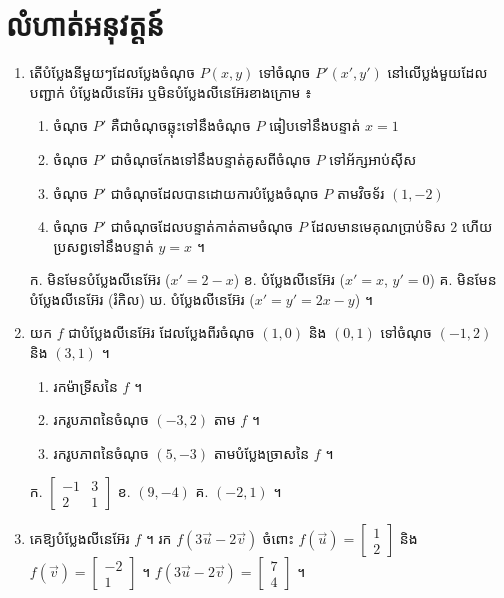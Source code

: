 \section*{លំហាត់អនុវត្តន៍}
\begin{enumerate}[1]
  \item តើបំប្លែងនីមួយៗដែលប្លែងចំណុច $P(x, y)$ ទៅចំណុច $P'(x', y')$ នៅលើប្លង់មួយដែលបញ្ជាក់ បំប្លែងលីនេអ៊ែរ ឬមិនបំប្លែងលីនេអ៊ែរខាងក្រោម ៖
  \begin{enumerate}[a]
    \item ចំណុច $P'$ គឺជាចំណុចឆ្លុះទៅនឹងចំណុច $P$ ធៀបទៅនឹងបន្ទាត់ $x = 1$
    \item ចំណុច $P'$ ជាចំណុចកែងទៅនឹងបន្ទាត់គូសពីចំណុច $P$ ទៅអ័ក្សអាប់ស៊ីស
    \item ចំណុច $P'$ ជាចំណុចដែលបានដោយការបំប្លែងចំណុច $P$ តាមវិចទ័រ $(1, -2)$
    \item ចំណុច $P'$ ជាចំណុចដែលបន្ទាត់កាត់តាមចំណុច $P$ ដែលមានមេគុណប្រាប់ទិស $2$ ហើយប្រសព្វទៅនឹងបន្ទាត់ $y = x$ ។
  \end{enumerate}
  \ans
  ក. មិនមែនបំប្លែងលីនេអ៊ែរ ($x' = 2 - x$) \quad ខ. បំប្លែងលីនេអ៊ែរ ($x' = x$, $y' = 0$) \quad គ. មិនមែនបំប្លែងលីនេអ៊ែរ (រំកិល) \quad ឃ. បំប្លែងលីនេអ៊ែរ ($x' = y' = 2x - y$) ។
  \item យក $f$ ជាបំប្លែងលីនេអ៊ែរ ដែលប្លែងពីរចំណុច $(1, 0)$ និង $(0, 1)$ ទៅចំណុច $(-1, 2)$ និង $(3, 1)$ ។
  \begin{enumerate}[a]
    \item រកម៉ាទ្រីសនៃ $f$ ។
    \item រករូបភាពនៃចំណុច $(-3, 2)$ តាម $f$ ។
    \item រករូបភាពនៃចំណុច $(5, -3)$ តាមបំប្លែងច្រាសនៃ $f$ ។
  \end{enumerate}
  \ans
  ក. $\begin{bmatrix} -1 & 3\\ 2 & 1 \end{bmatrix}$ \quad ខ. $(9, -4)$ \quad គ. $(-2, 1)$ ។
  \item គេឱ្យបំប្លែងលីនេអ៊ែរ $f$ ។ រក $f(3\overrightarrow{u} - 2\overrightarrow{v})$ ចំពោះ $f(\overrightarrow{u}) = \begin{bmatrix} 1\\ 2 \end{bmatrix}$ និង $f(\overrightarrow{v}) = \begin{bmatrix} -2\\ 1 \end{bmatrix}$ ។
  \ans
  $f(3\overrightarrow{u} - 2\overrightarrow{v}) = \begin{bmatrix} 7\\ 4 \end{bmatrix}$ ។

\end{enumerate}
